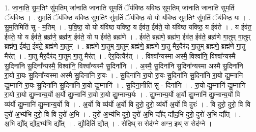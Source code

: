 \documentclass[17pt]{extarticle}
\begin{document}
1. जा॒ना॒ति॒ सु॒म॒तिꣳ सु॑म॒तिम् जा॑नाति जानाति सुम॒तिं ॅय॑विष्ठ यविष्ठ सुम॒तिम् जा॑नाति जानाति सुम॒तिं ॅय॑विष्ठ । . सु॒म॒तिं ॅय॑विष्ठ यविष्ठ सुम॒तिꣳ सु॑म॒तिं ॅय॑विष्ठ॒ यो यो य॑विष्ठ सुम॒तिꣳ सु॑म॒तिं ॅय॑विष्ठ॒ यः । . सु॒म॒तिमिति॑ सु - म॒तिम् । . य॒वि॒ष्ठ॒ यो यो य॑विष्ठ यविष्ठ॒ य ईव॑त॒ ईव॑ते॒ यो य॑विष्ठ यविष्ठ॒ य ईव॑ते । . य ईव॑त॒ ईव॑ते॒ यो य ईव॑ते॒ ब्रह्म॑णे॒ ब्रह्म॑ण॒ ईव॑ते॒ यो य ईव॑ते॒ ब्रह्म॑णे । . ईव॑ते॒ ब्रह्म॑णे॒ ब्रह्म॑ण॒ ईव॑त॒ ईव॑ते॒ ब्रह्म॑णे गा॒तुम् गा॒तुम् ब्रह्म॑ण॒ ईव॑त॒ ईव॑ते॒ ब्रह्म॑णे गा॒तुम् । . ब्रह्म॑णे गा॒तुम् गा॒तुम् ब्रह्म॑णे॒ ब्रह्म॑णे गा॒तु मैर॒दैर॑द् गा॒तुम् ब्रह्म॑णे॒ ब्रह्म॑णे गा॒तु मैर॑त् । . गा॒तु मैर॒दैर॑द् गा॒तुम् गा॒तु मैर॑त् । . ऐर॒दित्यैर॑त् । . विश्वा᳚न्यस्मा अस्मै॒ विश्वा॑नि॒ विश्वा᳚न्यस्मै सु॒दिना॑नि सु॒दिना᳚न्यस्मै॒ विश्वा॑नि॒ विश्वा᳚न्यस्मै सु॒दिना॑नि । . अ॒स्मै॒ सु॒दिना॑नि सु॒दिना᳚न्यस्मा अस्मै सु॒दिना॑नि रा॒यो रा॒यः सु॒दिना᳚न्यस्मा अस्मै सु॒दिना॑नि रा॒यः । . सु॒दिना॑नि रा॒यो रा॒यः सु॒दिना॑नि सु॒दिना॑नि रा॒यो द्यु॒म्नानि॑ द्यु॒म्नानि॑ रा॒यः सु॒दिना॑नि सु॒दिना॑नि रा॒यो द्यु॒म्नानि॑ । . सु॒दिना॒नीति॑ सु - दिना॑नि । . रा॒यो द्यु॒म्नानि॑ द्यु॒म्नानि॑ रा॒यो रा॒यो द्यु॒म्नान्य॒र्यो अ॒र्यो द्यु॒म्नानि॑ रा॒यो रा॒यो द्यु॒म्नान्य॒र्यः । . द्यु॒म्नान्य॒र्यो अ॒र्यो द्यु॒म्नानि॑ द्यु॒म्नान्य॒र्यो वि व्य॑र्यो द्यु॒म्नानि॑ द्यु॒म्नान्य॒र्यो वि । . अ॒र्यो वि व्य॑र्यो अ॒र्यो वि दुरो॒ दुरो॒ व्य॑र्यो अ॒र्यो वि दुरः॑ । . वि दुरो॒ दुरो॒ वि वि दुरो॑ अ॒भ्य॑भि दुरो॒ वि वि दुरो॑ अ॒भि । . दुरो॑ अ॒भ्य॑भि दुरो॒ दुरो॑ अ॒भि द्यौ᳚द् द्यौद॒भि दुरो॒ दुरो॑ अ॒भि द्यौ᳚त् । . अ॒भि द्यौ᳚द् द्यौद॒भ्य॑भि द्यौ᳚त् । . द्यौ॒दिति॑ द्यौत् । . सेदिथ् स सेद॑ग्ने अग्न॒ इथ् स सेद॑ग्ने । \newline
\end{document}
